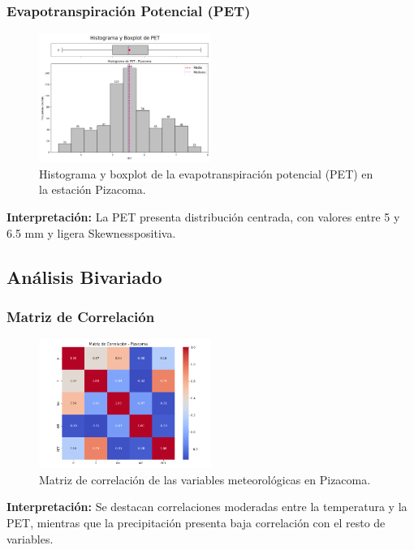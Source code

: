 \subsubsection*{Evapotranspiración Potencial (PET)}
\begin{figure}[H]
\centering
\includegraphics[width=0.5\textwidth]{resultados/por_estacion_meteorologica/Pizacoma/PET_histograma.png}
\caption{Histograma y boxplot de la evapotranspiración potencial (PET) en la estación Pizacoma.}
\label{fig:pizacoma_PET}
\end{figure}
\textbf{Interpretación:} La PET presenta distribución centrada, con valores entre 5 y 6.5 mm y ligera Skewnesspositiva.

\subsection{Análisis Bivariado}

\subsubsection*{Matriz de Correlación}
\begin{figure}[H]
\centering
\includegraphics[width=0.5\textwidth]{resultados/por_estacion_meteorologica/Pizacoma/matriz_correlacion.png}
\caption{Matriz de correlación de las variables meteorológicas en Pizacoma.}
\label{fig:pizacoma_corr}
\end{figure}
\textbf{Interpretación:} Se destacan correlaciones moderadas entre la temperatura y la PET, mientras que la precipitación presenta baja correlación con el resto de variables.

